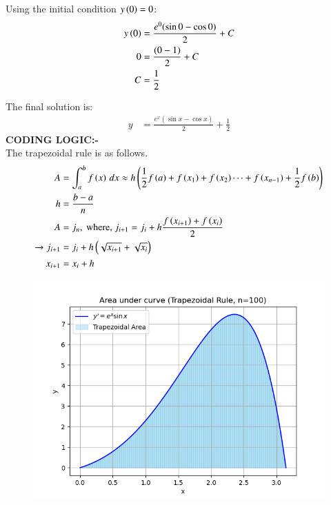 \documentclass[journal]{IEEEtran}
\numberwithin{equation}{enumi}
\numberwithin{figure}{enumi}
\begin{document}
\begin{enumerate}
Using the initial condition $ y\left(0\right) = 0 $:
\begin{align}
y\left(0\right) &= \frac{e^0 (\sin{0} - \cos{0})}{2} + C \\
0 &= \frac{(0 - 1)}{2} + C \\
C &= \frac{1}{2}
\end{align}

The final solution is:
\begin{align}
y &= \frac{e^x (\sin{x} - \cos{x})}{2} + \frac{1}{2}
\end{align}
\textbf{CODING LOGIC:-}\\




The trapezoidal rule is as follows.
\begin{align}
    A &= \int_a^b f\left(x\right)\, dx \approx h\left(\frac{1}{2}f\left(a\right) + f\left(x_1\right) + f\left(x_2\right) \cdots + f\left(x_{n-1}\right) + \frac{1}{2}f\left(b\right)\right)\\
    h &= \frac{b-a}{n}\\
    A &= j_n, \text{ where, } j_{i + 1} = j_i + h\frac{f\left(x_{i+1}\right) + f\left(x_i\right)}{2}\\ 
        \xrightarrow{} j_{i + 1} &= j_i + h\left(\sqrt{x_{i+1}}+\sqrt{x_{i}}\right)\\
    x_{i+1} &= x_i + h\\
\end{align}
\begin{figure}[h!]
   \centering
   \includegraphics[width=0.7\linewidth]{figs/Figure_1.png}
\end{figure}
   

\end{enumerate}
\end{document}
